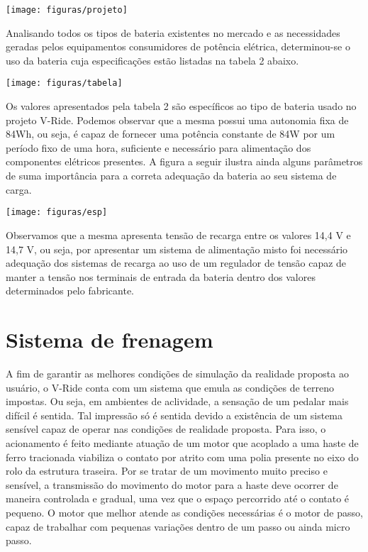  \begin{center}
    	\texttt{[image: figuras/projeto]}
        \label{projeto}
    \end{center}

Analisando todos os tipos de bateria existentes no mercado e as necessidades geradas pelos equipamentos consumidores de potência elétrica, determinou-se o uso da bateria cuja especificações estão listadas na tabela 2 abaixo.

 \begin{center}
    	\texttt{[image: figuras/tabela]}
        \label{tabela}
    \end{center}
Os valores apresentados pela tabela 2 são específicos ao tipo de bateria usado no projeto V-Ride. Podemos observar que a mesma possui uma autonomia fixa de 84Wh, ou seja, é capaz de fornecer uma potência constante de 84W por um período fixo de uma hora, suficiente e necessário para alimentação dos componentes elétricos presentes.
A figura a seguir ilustra ainda alguns parâmetros de suma importância para a correta adequação da bateria ao seu sistema de carga.


 \begin{center}
    	\texttt{[image: figuras/esp]}
        \label{esp}
    \end{center}
Observamos que a mesma apresenta tensão de recarga entre os valores 14,4 V e 14,7 V, ou seja, por apresentar um sistema de alimentação misto foi necessário adequação dos sistemas de recarga ao uso de um regulador de tensão capaz de manter a tensão nos terminais de entrada da bateria dentro dos valores determinados pelo fabricante.

    \section{Sistema de frenagem }
 A fim de garantir as melhores condições de simulação da realidade proposta ao usuário, o V-Ride conta com um sistema que emula as condições de terreno impostas. Ou seja, em ambientes de aclividade, a sensação de um pedalar mais difícil é sentida. Tal impressão só é sentida devido a existência de um sistema sensível capaz de operar nas condições de realidade proposta.
Para isso, o acionamento é feito mediante atuação de um motor que acoplado a uma haste de ferro tracionada viabiliza o contato por atrito com uma polia presente no eixo do rolo da estrutura traseira. Por se tratar de um movimento muito preciso e sensível, a transmissão do movimento do motor para a haste deve ocorrer de maneira controlada e gradual, uma vez que o espaço percorrido até o contato é pequeno. O motor que melhor atende as condições necessárias é o motor de passo, capaz de trabalhar com pequenas variações dentro de um passo ou ainda micro passo.

